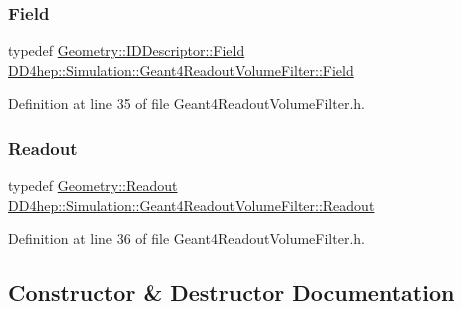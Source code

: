 \subsubsection{\texorpdfstring{Field}{Field}}
{\footnotesize\ttfamily typedef \hyperlink{class_d_d4hep_1_1_geometry_1_1_i_d_descriptor_ac06f5915e74f8a8f2ff73e9a322556e4}{Geometry\+::\+I\+D\+Descriptor\+::\+Field} \hyperlink{class_d_d4hep_1_1_simulation_1_1_geant4_readout_volume_filter_a6b5e464fd34617d118c15b917c9094fa}{D\+D4hep\+::\+Simulation\+::\+Geant4\+Readout\+Volume\+Filter\+::\+Field}\hspace{0.3cm}{\ttfamily [private]}}



Definition at line 35 of file Geant4\+Readout\+Volume\+Filter.\+h.

\hypertarget{class_d_d4hep_1_1_simulation_1_1_geant4_readout_volume_filter_a30e6a3445a33de61e3c648149e285c46}{}\label{class_d_d4hep_1_1_simulation_1_1_geant4_readout_volume_filter_a30e6a3445a33de61e3c648149e285c46} 
\subsubsection{\texorpdfstring{Readout}{Readout}}
{\footnotesize\ttfamily typedef \hyperlink{class_d_d4hep_1_1_geometry_1_1_readout}{Geometry\+::\+Readout} \hyperlink{class_d_d4hep_1_1_simulation_1_1_geant4_readout_volume_filter_a30e6a3445a33de61e3c648149e285c46}{D\+D4hep\+::\+Simulation\+::\+Geant4\+Readout\+Volume\+Filter\+::\+Readout}\hspace{0.3cm}{\ttfamily [private]}}



Definition at line 36 of file Geant4\+Readout\+Volume\+Filter.\+h.



\subsection{Constructor \& Destructor Documentation}
\hypertarget{class_d_d4hep_1_1_simulation_1_1_geant4_readout_volume_filter_a459197d17e4baedd3d1147e4def0aea9}{}\label{class_d_d4hep_1_1_simulation_1_1_geant4_readout_volume_filter_a459197d17e4baedd3d1147e4def0aea9} 
